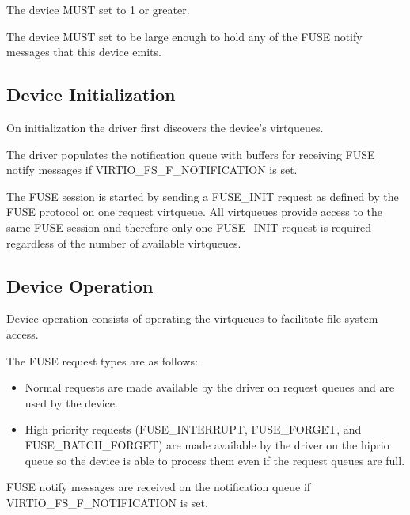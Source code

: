 
The device MUST set  to 1 or greater.

The device MUST set  to be large enough to hold any of
the FUSE notify messages that this device emits.

\subsection{Device Initialization}\label{Device Types / File System Device / Device Initialization}

On initialization the driver first discovers the device's virtqueues.

The driver populates the notification queue with buffers for receiving FUSE
notify messages if VIRTIO_FS_F_NOTIFICATION is set.

The FUSE session is started by sending a FUSE\_INIT request as defined by the
FUSE protocol on one request virtqueue.  All virtqueues provide access to the
same FUSE session and therefore only one FUSE\_INIT request is required
regardless of the number of available virtqueues.

\subsection{Device Operation}\label{sec:Device Types / File System Device / Device Operation}

Device operation consists of operating the virtqueues to facilitate file system
access.

The FUSE request types are as follows:
\begin{itemize}
\item Normal requests are made available by the driver on request queues and
      are used by the device.
\item High priority requests (FUSE\_INTERRUPT, FUSE\_FORGET, and
      FUSE\_BATCH\_FORGET) are made available by the driver on the hiprio queue
      so the device is able to process them even if the request queues are
      full.
\end{itemize}

FUSE notify messages are received on the notification queue if
VIRTIO_FS_F_NOTIFICATION is set.

